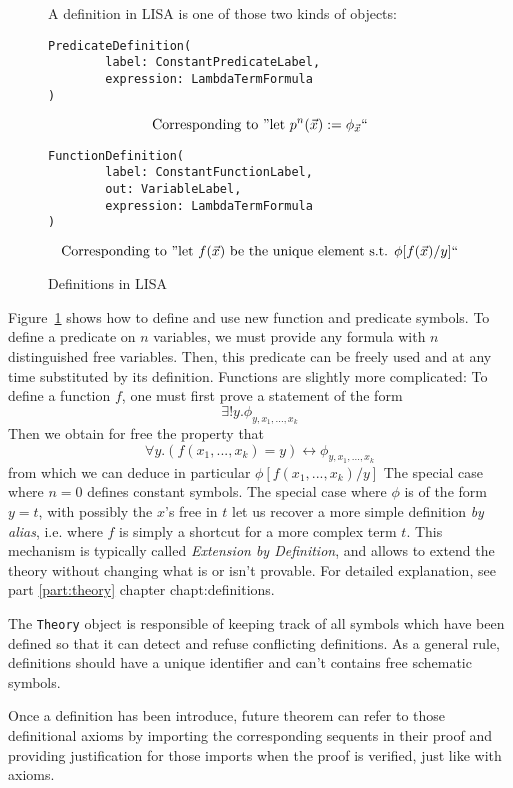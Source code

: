 \begin{figure}
A definition in LISA is one of those two kinds of objects:
\begin{lstlisting}[frame=single]
PredicateDefinition(
		label: ConstantPredicateLabel,
		expression: LambdaTermFormula
)
\end{lstlisting}
$$
\textnormal{Corresponding to ''let } p^n(\vec{x}) := \phi_{\vec{x}}\textnormal{``}
$$
\begin{lstlisting}[frame=single]
FunctionDefinition(
		label: ConstantFunctionLabel,
		out: VariableLabel, 
		expression: LambdaTermFormula
)
\end{lstlisting}
$$
\textnormal{Corresponding to ''let } f(\vec{x}) \textnormal{ be the unique element s.t. } \phi[f(\vec{x})/y]\textnormal{``}
$$
\caption{Definitions in LISA}
\label{fig:definitions}
\end{figure}
Figure~\ref{fig:definitions} shows how to define and use new function and predicate symbols. To define a predicate on $n$ variables, we must provide any formula with $n$ distinguished free variables. Then, this predicate can be freely used and at any time substituted by its definition. Functions are slightly more complicated: To define a function $f$, one must first prove a statement of the form 
$$\exists ! y. \phi_{y, x_1,...,x_k}$$
Then we obtain for free the property that 
$$\forall y. (f(x_1,...,x_k)=y) \leftrightarrow \phi_{y, x_1,...,x_k}$$
from which we can deduce in particular $\phi[f(x_1,...,x_k)/y]$
The special case where $n=0$ defines constant symbols. The special case where $\phi$ is of the form $y=t$, with possibly the $x$'s free in $t$ let us recover a more simple definition \textit{by alias}, i.e. where  $f$ is simply a shortcut for a more complex term $t$.
This mechanism is typically called \textit{Extension by Definition}, and allows to extend the theory without changing what is or isn't provable. For detailed explanation, see part \ref{part:theory} chapter {chapt:definitions}.

The \lstinline{Theory}{} object is responsible of keeping track of all symbols which have been defined so that it can detect and refuse conflicting definitions. As a general rule, definitions should have a unique identifier and can't contains free schematic symbols.

Once a definition has been introduce, future theorem can refer to those definitional axioms by importing the corresponding sequents in their proof and providing justification for those imports when the proof is verified, just like with axioms.

